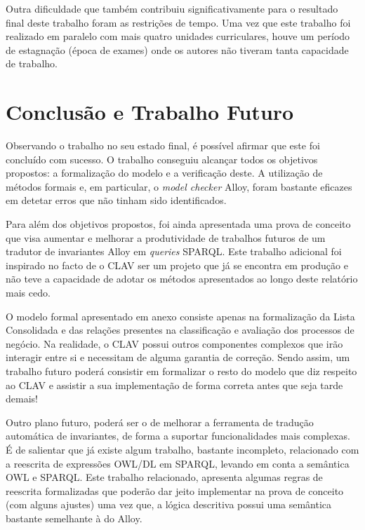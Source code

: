 \documentclass[tikz,runningheads,a4paper]{llncs}
\begin{document}
Outra dificuldade que também contribuiu significativamente para o resultado final deste trabalho foram as restrições de tempo. Uma vez que este trabalho foi realizado em paralelo com mais quatro unidades curriculares, houve um período de estagnação (época de exames) onde os autores não tiveram tanta capacidade de trabalho.

\section{Conclusão e Trabalho Futuro} \label{SecConclusion}

Observando o trabalho no seu estado final, é possível afirmar que este foi concluído com sucesso. O trabalho conseguiu alcançar todos os objetivos propostos: a formalização do modelo e a verificação deste. A utilização de métodos formais e, em particular, o \textit{model checker} Alloy, foram bastante eficazes em detetar erros que não tinham sido identificados.

Para além dos objetivos propostos, foi ainda apresentada uma prova de conceito que visa aumentar e melhorar a produtividade de trabalhos futuros de um tradutor de invariantes Alloy em \textit{queries} SPARQL. Este trabalho adicional foi inspirado no facto de o CLAV ser um projeto que já se encontra em produção e não teve a capacidade de adotar os métodos apresentados ao longo deste relatório mais cedo.

O modelo formal apresentado em anexo consiste apenas na formalização da Lista Consolidada e das relações presentes na classificação e avaliação dos processos de negócio. Na realidade, o CLAV possui outros componentes complexos que irão interagir entre si e necessitam de alguma garantia de correção. Sendo assim, um trabalho futuro poderá consistir em formalizar o resto do modelo que diz respeito ao CLAV e assistir a sua implementação de forma correta antes que seja tarde demais! 

Outro plano futuro, poderá ser o de melhorar a ferramenta de tradução automática de invariantes, de forma a suportar funcionalidades mais complexas. É de salientar que já existe algum trabalho, bastante incompleto, relacionado com a reescrita de expressões OWL/DL\cite{q-trad} em SPARQL, levando em conta a semântica OWL e SPARQL. Este trabalho relacionado, apresenta algumas regras de reescrita formalizadas que poderão dar jeito implementar na prova de conceito (com alguns ajustes) uma vez que, a lógica descritiva possui uma semântica bastante semelhante à do Alloy.
\end{document}
